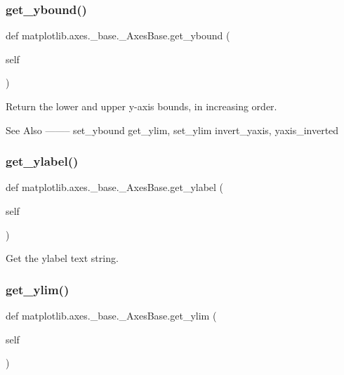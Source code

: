 \subsubsection{\texorpdfstring{get\+\_\+ybound()}{get\_ybound()}}
{\footnotesize\ttfamily def matplotlib.\+axes.\+\_\+base.\+\_\+\+Axes\+Base.\+get\+\_\+ybound (\begin{DoxyParamCaption}\item[{}]{self }\end{DoxyParamCaption})}

\begin{DoxyVerb}Return the lower and upper y-axis bounds, in increasing order.

See Also
--------
set_ybound
get_ylim, set_ylim
invert_yaxis, yaxis_inverted
\end{DoxyVerb}
 \mbox{\label{classmatplotlib_1_1axes_1_1__base_1_1__AxesBase_a605e28fbce70913222a288b7f33cad99}} 
\subsubsection{\texorpdfstring{get\+\_\+ylabel()}{get\_ylabel()}}
{\footnotesize\ttfamily def matplotlib.\+axes.\+\_\+base.\+\_\+\+Axes\+Base.\+get\+\_\+ylabel (\begin{DoxyParamCaption}\item[{}]{self }\end{DoxyParamCaption})}

\begin{DoxyVerb}Get the ylabel text string.
\end{DoxyVerb}
 \mbox{\label{classmatplotlib_1_1axes_1_1__base_1_1__AxesBase_af0f3702712b18872a9d7db0642bf034f}} 
\subsubsection{\texorpdfstring{get\+\_\+ylim()}{get\_ylim()}}
{\footnotesize\ttfamily def matplotlib.\+axes.\+\_\+base.\+\_\+\+Axes\+Base.\+get\+\_\+ylim (\begin{DoxyParamCaption}\item[{}]{self }\end{DoxyParamCaption})}

